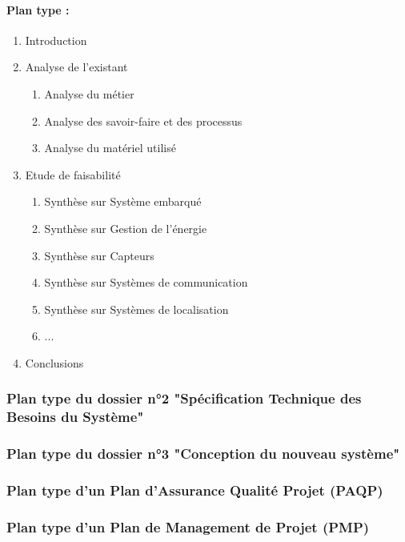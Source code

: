       \paragraph*{Plan type :\\}
        \begin{enumerate}
          \item Introduction
          \item Analyse de l'existant
            \begin{enumerate}
              \item Analyse du métier
              \item Analyse des savoir-faire et des processus
              \item Analyse du matériel utilisé
            \end{enumerate}
          \item Etude de faisabilité
            \begin{enumerate}
              \item Synthèse sur Système embarqué
              \item Synthèse sur Gestion de l'énergie
              \item Synthèse sur Capteurs
              \item Synthèse sur Systèmes de communication
              \item Synthèse sur Systèmes de localisation
              \item ...
            \end{enumerate} 
          \item Conclusions 
        \end{enumerate}
        
    \subsubsection{Plan type du dossier n°2 "Spécification Technique des Besoins du Système"}
    \subsubsection{Plan type du dossier n°3 "Conception du nouveau système"}
    \subsubsection{Plan type d'un Plan d'Assurance Qualité Projet (PAQP)}
    \subsubsection{Plan type d'un Plan de Management de Projet (PMP)}